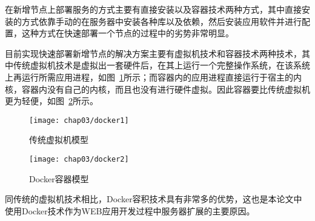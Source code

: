 在新增节点上部署服务的方式主要有直接安装以及容器技术两种方式，其中直接安装的方式依靠手动的在服务器中安装各种库以及依赖，然后安装应用软件并进行配置，这种方式在快速部署一个节点的过程中的劣势非常明显。

目前实现快速部署新增节点的解决方案主要有虚拟机技术和容器技术两种技术，其中传统虚拟机技术是虚拟出一套硬件后，在其上运行一个完整操作系统，在该系统上再运行所需应用进程，如图~\ref{fig:docker1}所示；而容器内的应用进程直接运行于宿主的内核，容器内没有自己的内核，而且也没有进行硬件虚拟。因此容器要比传统虚拟机更为轻便，如图~\ref{fig:docker2}所示\cite{刘熙2016基于}。

\begin{figure}[H] %
  \centering
  \texttt{[image: chap03/docker1]}
  \caption{传统虚拟机模型}
  \label{fig:docker1}
\end{figure}
\begin{figure}[H] %
  \centering
  \texttt{[image: chap03/docker2]}
  \caption{Docker容器模型}
  \label{fig:docker2}
\end{figure}
同传统的虚拟机技术相比，Docker容积技术具有非常多的优势，这也是本论文中使用Docker技术作为WEB应用开发过程中服务器扩展的主要原因\cite{chamberlain2014using}。
